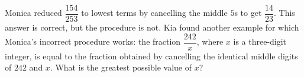 Monica reduced $\dfrac{154}{253}$ to lowest terms by cancelling the middle $5$s to get $\dfrac{14}{23}$. This answer is correct, but the procedure is not. Kia found another example for which Monica's incorrect procedure works: the fraction $\dfrac{242}{x}$, where $x$ is a three-digit integer, is equal to the fraction obtained by cancelling the identical middle digits of $242$ and $x$. What is the greatest possible value of $x$?
